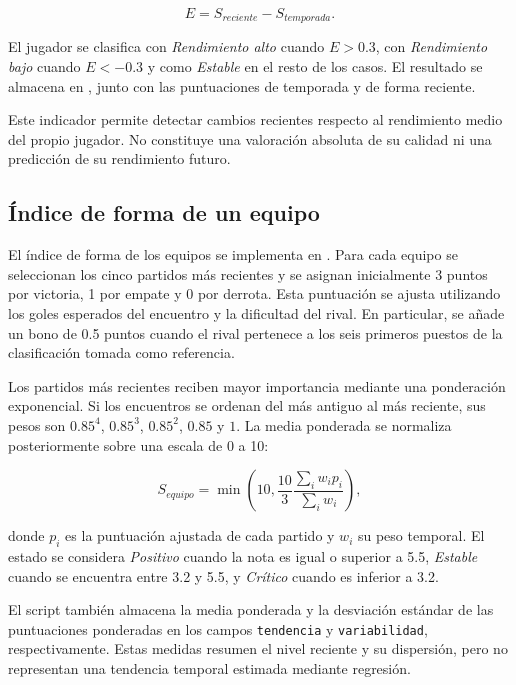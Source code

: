 \begin{equation}
    E=S_{reciente}-S_{temporada}.
\end{equation}

El jugador se clasifica con \textit{Rendimiento alto} cuando $E>0.3$, con \textit{Rendimiento bajo} cuando $E<-0.3$ y como \textit{Estable} en el resto de los casos. El resultado se almacena en , junto con las puntuaciones de temporada y de forma reciente.

Este indicador permite detectar cambios recientes respecto al rendimiento medio del propio jugador. No constituye una valoración absoluta de su calidad ni una predicción de su rendimiento futuro.

\subsection{Índice de forma de un equipo}

El índice de forma de los equipos se implementa en . Para cada equipo se seleccionan los cinco partidos más recientes y se asignan inicialmente 3 puntos por victoria, 1 por empate y 0 por derrota. Esta puntuación se ajusta utilizando los goles esperados del encuentro y la dificultad del rival. En particular, se añade un bono de 0.5 puntos cuando el rival pertenece a los seis primeros puestos de la clasificación tomada como referencia.

Los partidos más recientes reciben mayor importancia mediante una ponderación exponencial. Si los encuentros se ordenan del más antiguo al más reciente, sus pesos son $0.85^4$, $0.85^3$, $0.85^2$, $0.85$ y $1$. La media ponderada se normaliza posteriormente sobre una escala de 0 a 10:

\begin{equation}
    S_{equipo}=\min\left(10,\frac{10}{3}\frac{\sum_i w_i p_i}{\sum_i w_i}\right),
\end{equation}

donde $p_i$ es la puntuación ajustada de cada partido y $w_i$ su peso temporal. El estado se considera \textit{Positivo} cuando la nota es igual o superior a 5.5, \textit{Estable} cuando se encuentra entre 3.2 y 5.5, y \textit{Crítico} cuando es inferior a 3.2.

El script también almacena la media ponderada y la desviación estándar de las puntuaciones ponderadas en los campos \texttt{tendencia} y \texttt{variabilidad}, respectivamente. Estas medidas resumen el nivel reciente y su dispersión, pero no representan una tendencia temporal estimada mediante regresión.

